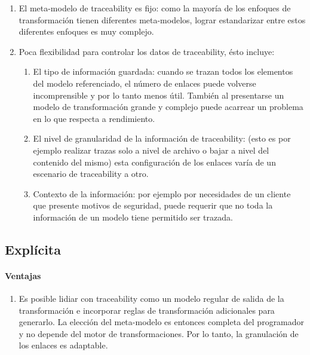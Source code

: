 \documentclass[a4paper,12pt,oneside]{book}
\begin{document}
\begin{enumerate}

\item     El meta-modelo de traceability es fijo: como la mayoría de los enfoques de transformación tienen diferentes meta-modelos, lograr estandarizar entre estos diferentes enfoques es muy complejo.

\item    Poca flexibilidad para controlar los datos de traceability, ésto incluye:

\begin{enumerate}

\item         El tipo de información guardada: cuando se trazan todos los elementos del modelo referenciado, el número de enlaces puede volverse incomprensible y por lo tanto menos útil. También al presentarse un modelo de transformación grande y complejo puede acarrear un problema en lo que respecta a rendimiento.

\item        El nivel de granularidad de la información de traceability: (esto es por ejemplo realizar trazas solo a nivel de archivo o bajar a nivel del contenido del mismo) esta configuración de los enlaces varía de un escenario de traceability a otro.

\item       Contexto de la información: por ejemplo por necesidades de un cliente que presente motivos de seguridad, puede requerir que no toda la información de un modelo tiene permitido ser trazada.

\end{enumerate}

\end{enumerate}


\subsection{Explícita}

\paragraph{Ventajas}

\begin{enumerate}

\item Es posible lidiar con traceability como un modelo regular de salida de la transformación e incorporar reglas de transformación adicionales para generarlo. La elección del meta-modelo es entonces completa del programador y no depende del motor de transformaciones. Por lo tanto, la granulación de los enlaces es adaptable.

\end{enumerate}
\end{document}
